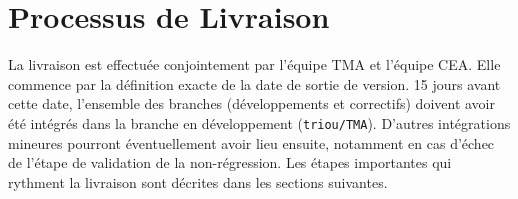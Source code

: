 

\chapter{\label{chapitre:livraison}Processus de Livraison}
La livraison est effectuée conjointement par l'équipe TMA et l'équipe CEA. Elle commence par la définition exacte de la date de sortie de version. 15 jours avant cette date, l'ensemble des branches (développements et correctifs) doivent avoir été intégrés dans la branche en développement (\texttt{triou/TMA}). D'autres intégrations mineures pourront éventuellement avoir lieu ensuite, notamment en cas d'échec de l'étape de validation de la non-régression. Les étapes importantes qui rythment la livraison sont décrites dans les sections suivantes.
